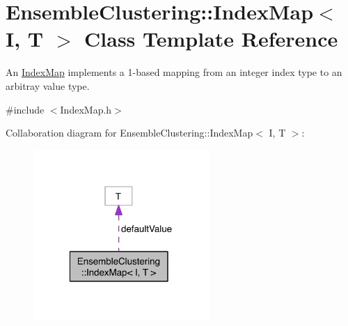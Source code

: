 \hypertarget{class_ensemble_clustering_1_1_index_map}{\section{Ensemble\-Clustering\-:\-:Index\-Map$<$ I, T $>$ Class Template Reference}
\label{class_ensemble_clustering_1_1_index_map}
}


An \hyperlink{class_ensemble_clustering_1_1_index_map}{Index\-Map} implements a 1-\/based mapping from an integer index type to an arbitray value type.  




{\ttfamily \#include $<$Index\-Map.\-h$>$}



Collaboration diagram for Ensemble\-Clustering\-:\-:Index\-Map$<$ I, T $>$\-:\nopagebreak
\begin{figure}[H]
\begin{center}
\leavevmode
\includegraphics[width=190pt]{class_ensemble_clustering_1_1_index_map__coll__graph}
\end{center}
\end{figure}
